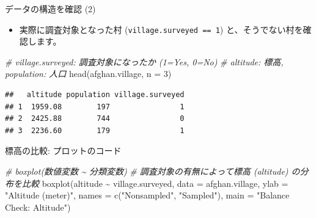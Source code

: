 \documentclass[
  ignorenonframetext,
]{beamer}
\newenvironment{Shaded}{\begin{snugshade}}{\end{snugshade}}
\newcommand{\AttributeTok}[1]{\textcolor[rgb]{0.77,0.63,0.00}{#1}}
\newcommand{\CommentTok}[1]{\textcolor[rgb]{0.56,0.35,0.01}{\textit{#1}}}
\newcommand{\DecValTok}[1]{\textcolor[rgb]{0.00,0.00,0.81}{#1}}
\newcommand{\FunctionTok}[1]{\textcolor[rgb]{0.00,0.00,0.00}{#1}}
\newcommand{\NormalTok}[1]{#1}
\newcommand{\SpecialCharTok}[1]{\textcolor[rgb]{0.00,0.00,0.00}{#1}}
\newcommand{\StringTok}[1]{\textcolor[rgb]{0.31,0.60,0.02}{#1}}
\providecommand{\tightlist}{%
  \setlength{\itemsep}{0pt}\setlength{\parskip}{0pt}}
\begin{document}
\begin{frame}[fragile]{データの構造を確認 (2)}
\protect\hypertarget{ux30c7ux30fcux30bfux306eux69cbux9020ux3092ux78baux8a8d-2}{}
\begin{itemize}
\tightlist
\item
  実際に調査対象となった村 (\texttt{village.surveyed\ ==\ 1})
  と、そうでない村を確認します。
\end{itemize}

\scriptsize

\begin{Shaded}
\begin{Highlighting}[]
\CommentTok{\# village.surveyed: 調査対象になったか (1=Yes, 0=No)}
\CommentTok{\# altitude: 標高, population: 人口}
\FunctionTok{head}\NormalTok{(afghan.village, }\AttributeTok{n =} \DecValTok{3}\NormalTok{)}
\end{Highlighting}
\end{Shaded}

\begin{verbatim}
##   altitude population village.surveyed
## 1  1959.08        197                1
## 2  2425.88        744                0
## 3  2236.60        179                1
\end{verbatim}

\normalsize
\end{frame}

\begin{frame}[fragile]{標高の比較: プロットのコード}
\protect\hypertarget{ux6a19ux9ad8ux306eux6bd4ux8f03-ux30d7ux30edux30c3ux30c8ux306eux30b3ux30fcux30c9}{}
\scriptsize

\begin{Shaded}
\begin{Highlighting}[]
\CommentTok{\# boxplot(数値変数 \textasciitilde{} 分類変数)}
\CommentTok{\# 調査対象の有無によって標高 (altitude) の分布を比較}
\FunctionTok{boxplot}\NormalTok{(altitude }\SpecialCharTok{\textasciitilde{}}\NormalTok{ village.surveyed, }
        \AttributeTok{data =}\NormalTok{ afghan.village,}
        \AttributeTok{ylab =} \StringTok{"Altitude (meter)"}\NormalTok{, }
        \AttributeTok{names =} \FunctionTok{c}\NormalTok{(}\StringTok{"Nonsampled"}\NormalTok{, }\StringTok{"Sampled"}\NormalTok{),}
        \AttributeTok{main =} \StringTok{"Balance Check: Altitude"}\NormalTok{)}
\end{Highlighting}
\end{Shaded}

\normalsize
\end{frame}
\end{document}

